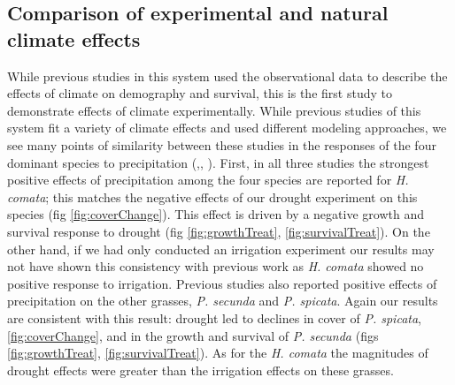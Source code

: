 \documentclass[11pt]{article}
\begin{document}
\begin{doublespace}
\subsection*{Comparison of experimental and natural climate effects}
While previous studies in this system used the observational data to describe the effects of climate on demography and survival, this is the first study to demonstrate effects of climate experimentally. While previous studies of this system fit a variety of climate effects and used different modeling approaches, we see many points of similarity between these studies in the responses of the four dominant species to precipitation (\citep{chu_direct_2016},\citep{dalgleish_climate_2010}, \citep{adler_forecasting_2012}). First, in all three studies the strongest positive effects of precipitation among the four species are reported for \textit{H. comata}; this matches the negative effects of our drought experiment on this species (fig \ref{fig:coverChange}). This effect is driven by a negative growth and survival response to drought (fig \ref{fig:growthTreat}, \ref{fig:survivalTreat}). On the other hand, if we had only conducted an irrigation experiment our results may not have shown this consistency with previous work as \textit{H. comata} showed no positive response to irrigation. Previous studies also reported positive effects of precipitation on the other grasses, \textit{P. secunda} and \textit{P. spicata}. Again our results are consistent with this result: drought led to declines in cover of \textit{P. spicata}, \ref{fig:coverChange}, and in the growth and survival of \textit{P. secunda} (figs \ref{fig:growthTreat}, \ref{fig:survivalTreat}). As for the \textit{H. comata} the magnitudes of drought effects were greater than the irrigation effects on these grasses. 


\end{doublespace}
\end{document}
